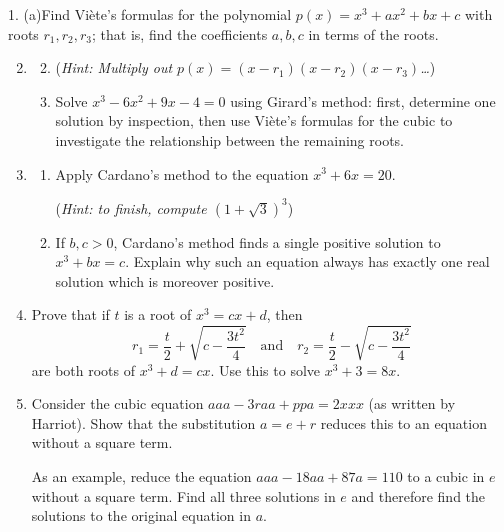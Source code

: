 \begin{exercises}{}{}
	\hangindent\doubleind
	\textup{1.}\hspace{\labelsep} (a)\lstsp Find Viète's formulas for the polynomial $p(x)=x^3+ax^2+bx+c$ with roots $r_1,r_2,r_3$; that is, find the coefficients $a,b,c$ in terms of the roots.\vspace{-10pt}
	
	\begin{enumerate}\setcounter{enumi}{1}
	  \item[]\begin{enumerate}\setcounter{enumii}{1}
	    \item[](\emph{Hint: Multiply out $p(x)=(x-r_1)(x-r_2)(x-r_3)$\ldots})
	    
	    \item%
	  Solve $x^3-6x^2+9x-4=0$ using Girard's method: first, determine one solution by inspection, then use Viète's formulas for the cubic to investigate the relationship between the remaining roots.
	  \end{enumerate}
	  
		
			
		\item\begin{enumerate}
		  \item Apply Cardano's method to the equation $x^3+6x=20$.\par
		  (\emph{Hint: to finish, compute $(1+\sqrt 3)^3$})
			\item If $b,c>0$, Cardano's method finds a single positive solution to $x^3+bx=c$. Explain why such an equation always has exactly one real solution which is moreover positive.
		\end{enumerate}
		
		\item%
		Prove that if $t$ is a root of $x^3=cx+d$, then
		\[
			r_1=\frac t2+\sqrt{c-\frac{3t^2}4}
			\quad\text{and}\quad 
			r_2=\frac t2-\sqrt{c-\frac{3t^2}4}
		\]
		are both roots of $x^3+d=cx$. Use this to solve $x^3+3=8x$.
		
	
		\item%
		Consider the cubic equation $aaa-3raa+ppa=2xxx$ (as written by Harriot). Show that the substitution $a=e+r$ reduces this to an equation without a square term.\par
		As an example, reduce the equation $aaa-18aa+87a=110$ to a cubic in $e$ without a square term. Find all three solutions in $e$ and therefore find the solutions to the original equation in $a$.
		

\end{enumerate}
\end{exercises}
